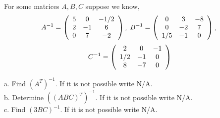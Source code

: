 \documentclass{ximera}
\begin{document}
\begin{exercise}
For some matrices $A, B, C$ suppose we know,
\[ A^{-1} = \left(\begin{array}{ccc}
5 & 0 & -1/2 \\
2 &-1 & 6\\
0 & 7 & -2 
\end{array}\right), \hspace{.1cm} B^{-1} = 
\left(\begin{array}{ccc}
0 & 3 & -8 \\
0 &-2 & 7\\
1/5 & -1 & 0
\end{array}\right), \]
\[\hspace{.1cm} C^{-1} =
\left(\begin{array}{ccc}
2 & 0 & -1 \\
1/2 &-1 & 0\\
8 & -7 & 0
\end{array}\right)
\]

a. Find $\left(A^{T}\right)^{-1}$. If it is not possible write N/A. \\
b. Determine $\left((ABC)^{T}\right)^{-1}$. If it is not possible write N/A.\\
c. Find $\left(3BC\right)^{-1}$. If it is not possible write N/A. 
\end{exercise} 
\end{document}
